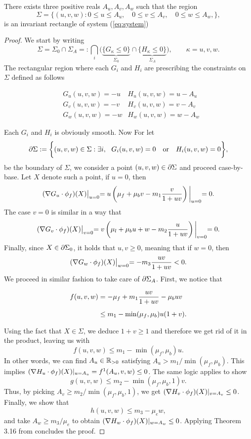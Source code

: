 \begin{proposition}
	There exists three positive reals $A_u, A_v, A_w$ such that the region $$\Sigma = \bigl\{(u, v, w) : 0 \le u \le A_u, \quad 0 \le v \le A_v, \quad  0 \le w \le A_w, \bigr\},$$ is an invariant rectangle of system (\ref{eq:system})
\end{proposition}

\begin{proof}
	We start by writing $$\Sigma = \Sigma_0 \cap \Sigma_A =: \bigcap_i \biggl( \underbrace{\{G_\kappa \le 0\}}_{\Sigma_0} \cap \underbrace{\{H_\kappa \le 0\}}_{\Sigma_A}\biggr), \qquad \kappa = u, v, w.$$
	The rectangular region where each $G_i$ and $H_i$ are prescribing the constraints on $\Sigma$ defined as follows
	
	\begin{align*}
		& G_u(u, v, w) = -u & H_u(u, v, w) = u - A_u \\[1em]
		& G_v(u, v, w) = -v & H_v(u, v, w) = v - A_v \\[1em]
		& G_w(u, v, w) = -w & H_w(u, v, w) = w - A_w
	\end{align*}

	Each $G_i$ and $H_i$ is obviously smooth. Now For let $$\partial\Sigma := \biggl\{(u,v,w) \in \Sigma : \exists i, \ \  G_i(u, v, w) = 0 \quad\text{or}\quad H_i(u, v, w) = 0 \biggr\},$$ be the boundary of $\Sigma$, we consider a point  $(u, v, w) \in \partial \Sigma$ and proceed case-by-base. Let $X $ denote such a point, if $u=0$, then $$(\nabla G_u \cdot \phi_f)(X)\bigl\vert_{u=0} = u \left( \mu_f  + \mu_b v - m_1 \dfrac{v}{1 + uv}\right)\biggl\vert_{u=0} = 0.$$ The case $v= 0$ is similar in a way that
	$$(\nabla G_v \cdot \phi_f)(X)\bigl\vert_{v=0} = v \left( \mu_l  + \mu_b u + w - m_2 \dfrac{u}{1 + uv}\right)\biggl\vert_{v=0} = 0.$$ Finally, since $X \in \partial\Sigma_0$, it holds that $u, v \ge 0$, meaning that if $w=0$, then $$(\nabla G_w \cdot \phi_f)(X)\bigl\vert_{w=0} = -m_3 \dfrac{uv}{1 + uv} < 0.$$ We proceed in similar fashion to take care of $\partial\Sigma_A$. First, we notice that
	
	\begin{align}
		f(u, v, w) &= -\mu_f + m_1 \dfrac{uv}{1 + uv} - \mu_b uv \notag \\[0.5em]
		& \le m_1 - \min(\mu_f, \mu_b) u (1 + v). \notag
	\end{align}
	
	Using the fact that $X \in \Sigma$, we deduce $1 + v \ge 1$ and therefore we get rid of it in the product, leaving us with 
	$$f(u, v, w) \le m_1 - \min(\mu_f, \mu_b) u.$$
	In other words, we can find $A_u \in \mathbb{R}_{>0}$ satisfying $A_u > m_1 / \min(\mu_f, \mu_b)$. This implies $(\nabla H_u \cdot \phi_f)(X)\vert_{u=A_u} = f^1(A_u, v, w) \le 0$. The same logic applies to show $$g(u, v, w) \le m_2 - \min(\mu_f, \mu_b, 1) v.$$ Thus, by picking $A_v \ge m_2 / \min(\mu_f, \mu_b, 1)$, we get $(\nabla H_v \cdot \phi_f)(X)\vert_{v=A_v} \le 0$. Finally, we show that $$h(u, v, w) \le m_3 - \mu_e w,$$ and take $A_w \ge m_3 / \mu_e$ to obtain $(\nabla H_w \cdot \phi_f)(X)\vert_{w=A_w} \le 0$. Applying Theorem 3.16 from \cite{AnnaThesis} concludes the proof.
\end{proof}


